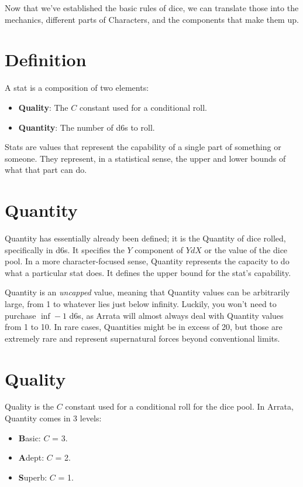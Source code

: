 \documentclass[../main.tex]{subfiles}
\begin{document}
    Now that we've established the basic rules of dice, we can translate those into the mechanics, different parts of Characters, and the components that make them up.

    \section{Definition}

    A stat is a composition of two elements:

    \begin{itemize}
        \item \textbf{Quality}: The $C$ constant used for a conditional roll.
        \item \textbf{Quantity}: The number of d6s to roll.
    \end{itemize}

    Stats are values that represent the capability of a single part of something or someone. They represent, in a statistical sense, the upper and lower bounds of what that part can do.

    \section{Quantity}

    Quantity has essentially already been defined; it is the Quantity of dice rolled, specifically in d6s. It specifies the $Y$ component of $YdX$ or the value of the dice pool. In a more character-focused sense, Quantity represents the capacity to do what a particular stat does. It defines the upper bound for the stat's capability.

    Quantity is an {\em uncapped} value, meaning that Quantity values can be arbitrarily large, from 1 to whatever lies just below infinity. Luckily, you won't need to purchase $\inf - 1$ d6s, as Arrata will almost always deal with Quantity values from 1 to 10. In rare cases, Quantities might be in excess of 20, but those are extremely rare and represent supernatural forces beyond conventional limits.

    \section{Quality}

    Quality is the $C$ constant used for a conditional roll for the dice pool. In Arrata, Quantity comes in 3 levels:
    
    \begin{itemize}
        \item \textbf{B}asic:  $C$ = 3.
        \item \textbf{A}dept:  $C$ = 2.
        \item \textbf{S}uperb: $C$ = 1.
    \end{itemize}
\end{document}
